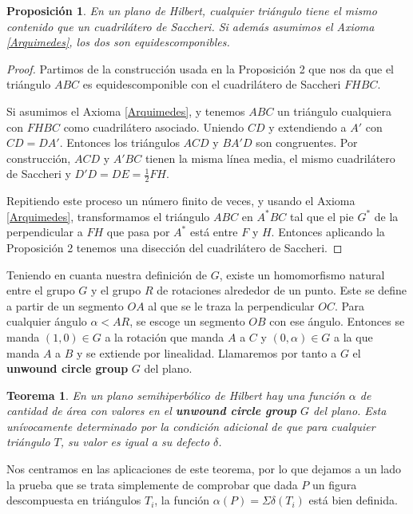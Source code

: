 \documentclass[a4paper]{amsart}
\theoremstyle{plain}
\newtheorem{theorem}{Teorema}
\newtheorem{proposition}{Proposición}
\begin{document}
\begin{proposition}
En un plano de Hilbert, cualquier triángulo tiene el mismo contenido que un cuadrilátero de Saccheri. Si además asumimos el Axioma \ref{Arquimedes}, los dos son equidescomponibles.
\end{proposition}

\begin{proof}
Partimos de la construcción usada en la Proposición 2 que nos da que el triángulo $ABC$ es equidescomponible con el cuadrilátero de Saccheri $FHBC$.

Si asumimos el Axioma \ref{Arquimedes}, y tenemos $ABC$ un triángulo cualquiera con $FHBC$ como cuadrilátero asociado. Uniendo $CD$ y extendiendo a $A'$ con $CD=DA'$. Entonces los triángulos $ACD$ y $BA'D$ son congruentes. Por construcción, $ACD$ y $A'BC$ tienen la misma línea media, el mismo cuadrilátero de Saccheri y $D'D=DE=\frac{1}{2}FH$.

Repitiendo este proceso un número finito de veces, y usando el Axioma \ref{Arquimedes}, transformamos el triángulo $ABC$ en $A^*BC$ tal que el pie $G^*$ de la perpendicular a $FH$ que pasa por $A^*$  está entre $F$ y $H$. Entonces aplicando la Proposición 2 tenemos una disección del cuadrilátero de Saccheri.
\end{proof}

Teniendo en cuanta nuestra definición de $G$, existe un homomorfismo natural entre el grupo $G$ y el grupo $R$ de rotaciones alrededor de un punto. Este se define a partir de un segmento $OA$ al que se le traza la perpendicular $OC$. Para cualquier ángulo $\alpha<AR$, se escoge un segmento $OB$ con ese ángulo. Entonces se manda $(1,0)\in G$ a la rotación que manda $A$ a $C$ y $(0,\alpha)\in G$ a la que manda $A$ a $B$ y se extiende por linealidad.  Llamaremos por tanto a $G$ el \textbf{unwound circle group} $G$ del plano.

\begin{theorem}
En un plano semihiperbólico de Hilbert hay una función $\alpha$ de cantidad de área con valores en el \textbf{unwound circle group} $G$ del plano. Esta unívocamente determinado por la condición adicional de que para cualquier triángulo $T$, su valor es igual a su defecto $\delta$.
\end{theorem}

Nos centramos en las aplicaciones de este teorema, por lo que dejamos a un lado la prueba que se trata simplemente de comprobar que dada $P$ un figura descompuesta en triángulos $T_i$, la función $\alpha(P)=\Sigma\delta(T_i)$  está bien definida.
\end{document}
